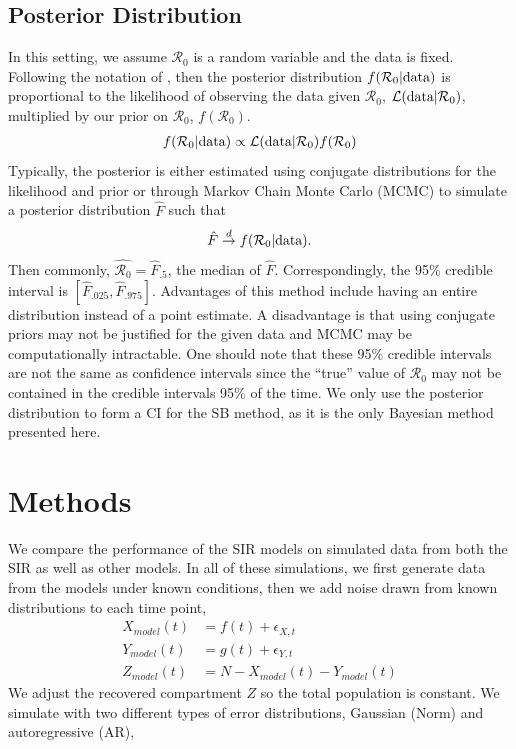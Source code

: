 \documentclass[12pt]{article}
\newcommand{\rr}{\ensuremath{\mathcal{R}_0}}
\begin{document}
\subsection{Posterior Distribution}
In this setting, we assume $\rr$ is a random variable and the data is fixed.  Following the notation of \cite{wasserman2004}, then the posterior distribution $f(\rr | \textnormal{data})$ is proportional to the likelihood of observing the data given $\rr$, $\mathcal{L}(\textnormal{data}|\rr)$, multiplied by our prior on $\rr$, $f(\rr)$. 
\begin{align*}
f(\rr | \textnormal{data} ) \propto \mathcal{L}(\textnormal{data} | \rr) f(\rr)
\end{align*}
 Typically, the posterior is either estimated using conjugate distributions for the likelihood and prior or through Markov Chain Monte Carlo (MCMC) to simulate a posterior distribution $\hat{F}$ such that
\begin{align*}
\hat{F} \overset{d}{\to} f(\rr| \textnormal{data}).
\end{align*}
Then commonly, $\hat{\rr} = \hat{F}_{.5}$, the median of $\hat{F}$.  Correspondingly, the 95\% credible interval is $\left[\hat{F}_{.025}, \hat{F}_{.975} \right ]$. Advantages of this method include having an entire distribution instead of a point estimate.  A disadvantage is that using conjugate priors may not be justified for the given data and MCMC may be computationally intractable.  One should note that these 95\% credible intervals are not the same as confidence intervals since the ``true'' value of $\rr$ may not be contained in the credible intervals 95\% of the time.  We only use the posterior distribution to form a CI for the SB method, as it is the only Bayesian method presented here.





\section{Methods}\label{sec:sim-res}

We compare the performance of the SIR models on simulated data from both the SIR as well as other models. In all of these simulations, we first generate data from the models under known conditions, then we add noise drawn from known distributions to each time point,
\begin{align}\label{eq:sim-models}
  X_{model}(t) &= f(t) + \epsilon_{X,t} \\
  Y_{model}(t) &= g(t) + \epsilon_{Y,t} \nonumber\\
  Z_{model}(t) &= N - X_{model}(t) - Y_{model}(t)\nonumber 
\end{align}
We adjust the recovered compartment $Z$ so the total population is constant. 
We simulate with two different types of error distributions, Gaussian (Norm) and autoregressive (AR),
\end{document}
